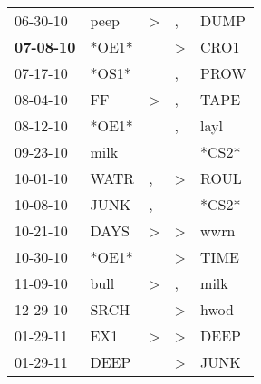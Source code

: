 \begin{supertabular}{p{0.07\textwidth}p{0.06\textwidth}p{0.02\textwidth}p{0.02\textwidth}p{0.06\textwidth}}
          06-30-10\textsuperscript{} &           peep\textsuperscript{} &     \textgreater &                , &           DUMP\textsuperscript{} \\
 \textbf{07-08-10\textsuperscript{}} &                            *OE1* &                  &     \textgreater &           CRO1\textsuperscript{} \\
          07-17-10\textsuperscript{} &                            *OS1* &                  &                , &           PROW\textsuperscript{} \\
          08-04-10\textsuperscript{} &             FF\textsuperscript{} &     \textgreater &                , &           TAPE\textsuperscript{} \\
          08-12-10\textsuperscript{} &                            *OE1* &                  &                , &           layl\textsuperscript{} \\
          09-23-10\textsuperscript{} &           milk\textsuperscript{} &                  &                  &                            *CS2* \\
          10-01-10\textsuperscript{} &           WATR\textsuperscript{} &                , &     \textgreater &           ROUL\textsuperscript{} \\
          10-08-10\textsuperscript{} &           JUNK\textsuperscript{} &                , &                  &                            *CS2* \\
          10-21-10\textsuperscript{} &           DAYS\textsuperscript{} &     \textgreater &     \textgreater &           wwrn\textsuperscript{} \\
          10-30-10\textsuperscript{} &                            *OE1* &                  &     \textgreater &           TIME\textsuperscript{} \\
          11-09-10\textsuperscript{} &           bull\textsuperscript{} &     \textgreater &                , &           milk\textsuperscript{} \\
          12-29-10\textsuperscript{} &           SRCH\textsuperscript{} &                  &     \textgreater &           hwod\textsuperscript{} \\
          01-29-11\textsuperscript{} &            EX1\textsuperscript{} &     \textgreater &     \textgreater &           DEEP\textsuperscript{} \\
          01-29-11\textsuperscript{} &           DEEP\textsuperscript{} &                  &     \textgreater &           JUNK\textsuperscript{} \\

\end{supertabular}
